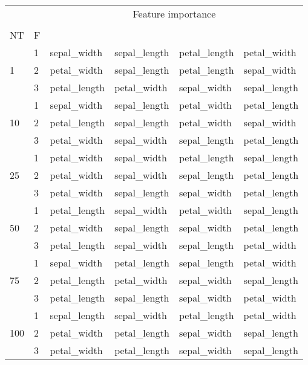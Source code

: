 \begin{table}[htbp]
\centering
\label{iris-features}
\begin{tabular}{llllll}
\toprule
 &  & \multicolumn{4}{c}{Feature importance} \\
 &  & #1 & #2 & #3 & #4 \\
NT & F &  &  &  &  \\
\midrule
\multirow[c]{3}{*}{1} & 1 & sepal_width & sepal_length & petal_length & petal_width \\
 & 2 & petal_width & sepal_length & petal_length & sepal_width \\
 & 3 & petal_length & petal_width & sepal_width & sepal_length \\
\multirow[c]{3}{*}{10} & 1 & sepal_width & sepal_length & petal_width & petal_length \\
 & 2 & petal_length & sepal_length & petal_width & sepal_width \\
 & 3 & petal_width & sepal_width & sepal_length & petal_length \\
\multirow[c]{3}{*}{25} & 1 & petal_width & sepal_width & petal_length & sepal_length \\
 & 2 & petal_width & sepal_width & sepal_length & petal_length \\
 & 3 & petal_width & sepal_length & sepal_width & petal_length \\
\multirow[c]{3}{*}{50} & 1 & petal_length & sepal_width & petal_width & sepal_length \\
 & 2 & petal_width & sepal_length & sepal_width & petal_length \\
 & 3 & petal_length & sepal_width & sepal_length & petal_width \\
\multirow[c]{3}{*}{75} & 1 & sepal_width & petal_length & sepal_length & petal_width \\
 & 2 & petal_length & petal_width & sepal_width & sepal_length \\
 & 3 & petal_length & sepal_length & sepal_width & petal_width \\
\multirow[c]{3}{*}{100} & 1 & sepal_length & sepal_width & petal_length & petal_width \\
 & 2 & petal_width & petal_length & sepal_width & sepal_length \\
 & 3 & petal_width & petal_length & sepal_width & sepal_length \\
\bottomrule
\end{tabular}
\end{table}
